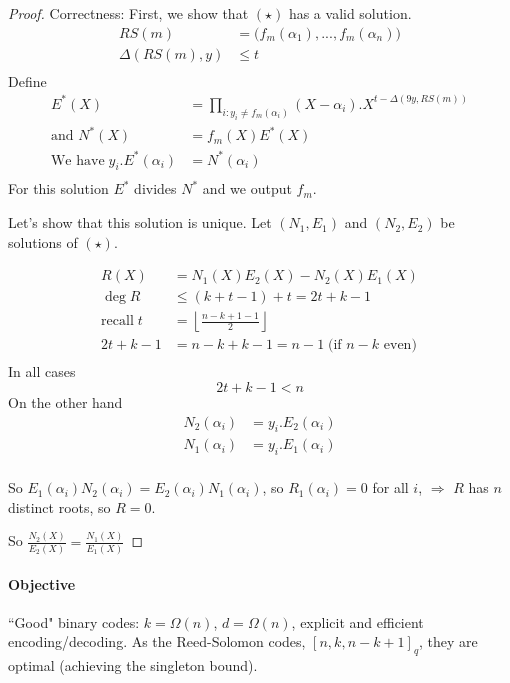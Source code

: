 \documentclass{article}
\begin{document}
\begin{proof}{Correctness:} First, we show that $(\star)$ has a valid solution.
\begin{align*}
RS(m) & = \Big( f_m(\alpha_1),...,f_m(\alpha_n) \Big)\\
\Delta(RS(m),y) & \leq t\\
\end{align*}
Define
\begin{align*}
E^*(X) & = \prod_{i:y_i \neq f_m(\alpha_i)} (X-\alpha_i).X^{t-\Delta (9y,RS(m))} \\
\text{and } N^*(X) & = f_m (X) E^*(X)\\
\text{We have}\; y_i.E^*(\alpha_i) & = N^*(\alpha_i)\\
\end{align*}
For this solution $E^*$ divides $N^*$ and we output $f_m$.

Let's show that this solution is unique. Let $(N_1, E_1)$ and $(N_2, E_2)$ be solutions of $(\star)$.

\begin{align*}
R(X) & = N_1(X)E_2(X)-N_2(X)E_1(X)\\
\deg R & \leq (k+t-1) + t = 2t + k - 1\\
\text{recall}\; t &= \left\lfloor \frac{n-k+1-1}{2} \right\rfloor\\
2t+k-1 & = n-k+k-1 = n-1 \;\text{(if $n-k$ even)}\\
\end{align*}
In all cases
\[2t + k -1 < n\]
On the other hand
\begin{align*}
N_2(\alpha_i) & = y_i. E_2(\alpha_i)\\
N_1(\alpha_i) & = y_i. E_1(\alpha_i)\\
\end{align*}

So $E_1(\alpha_i)N_2(\alpha_i)=E_2(\alpha_i)N_1(\alpha_i)$, so $R_1(\alpha_i)=0$ for all $i$, $\Rightarrow$ $R$ has $n$  distinct roots, so $R=0$.

So $\frac{N_2(X)}{E_2(X)}=\frac{N_1(X)}{E_1(X)}$ 

\end{proof}


\paragraph{Objective}
``Good" binary codes: $k=\Omega (n)$, $d=\Omega (n)$, explicit and efficient encoding/decoding. As the Reed-Solomon codes, $[n,k,n-k+1]_q$, they are optimal (achieving the singleton bound).
\end{document}
